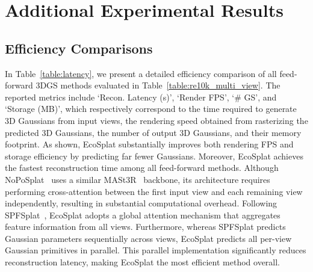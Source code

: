 \clearpage
\setcounter{page}{1}
\maketitlesupplementary

\appendix

\section{Additional Experimental Results}
 
\subsection{Efficiency Comparisons}
In Table~\ref{table:latency}, we present a detailed efficiency comparison of all feed-forward 3DGS methods evaluated in Table~\ref{table:re10k_multi_view}. The reported metrics include `Recon. Latency (s)', `Render FPS', `\# GS', and `Storage (MB)', which respectively correspond to the time required to generate 3D Gaussians from input views, the rendering speed obtained from rasterizing the predicted 3D Gaussians, the number of output 3D Gaussians, and their memory footprint.
As shown, EcoSplat substantially improves both rendering FPS and storage efficiency by predicting far fewer Gaussians. Moreover, EcoSplat achieves the fastest reconstruction time among all feed-forward methods. Although NoPoSplat~\cite{ye2024no} uses a similar MASt3R~\cite{mast3r_eccv24} backbone, its architecture requires performing cross-attention between the first input view and each remaining view independently, resulting in substantial computational overhead. Following SPFSplat~\cite{huang2025no}, EcoSplat adopts a global attention mechanism that aggregates feature information from all views. Furthermore, whereas SPFSplat predicts Gaussian parameters sequentially across views, EcoSplat predicts all per-view Gaussian primitives in parallel. This parallel implementation significantly reduces reconstruction latency, making EcoSplat the most efficient method overall.
\vspace{-0.2cm}

